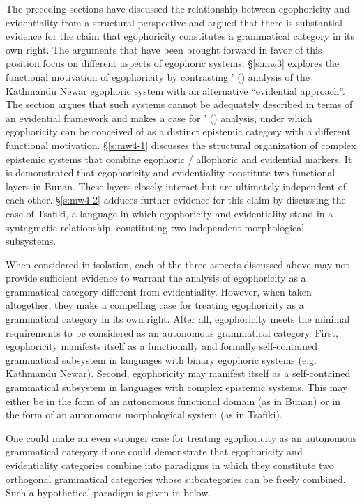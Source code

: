 \documentclass[output=paper]{langsci/langscibook}
\begin{document}
The preceding sections have discussed the relationship between egophoricity and evidentiality from a structural perspective and argued that there is substantial evidence for the claim that egophoricity constitutes a grammatical category in its own right. The arguments that have been brought forward in favor of this position focus on different aspects of egophoric systems. §\ref{s:mw3} explores the functional motivation of egophoricity by contrasting \citeauthor{Hargreaves2005}’ (\citeyear{Hargreaves2005}) analysis of the Kathmandu Newar egophoric system with an alternative “evidential approach”. The section argues that such systems cannot be adequately described in terms of an evidential framework and makes a case for \citeauthor{Hargreaves2005}’ (\citeyear{Hargreaves2005}) analysis, under which egophoricity can be conceived of as a distinct epistemic category with a different functional motivation. §\ref{s:mw4-1} discusses the structural organization of complex epistemic systems that combine egophoric / allophoric and evidential markers. It is demonstrated that egophoricity and evidentiality constitute two functional layers in Bunan. These layers closely interact but are ultimately independent of each other. §\ref{s:mw4-2} adduces further evidence for this claim by discussing the case of Tsafiki, a language in which egophoricity and evidentiality stand in a syntagmatic relationship, constituting two independent morphological subsystems.

When considered in isolation, each of the three aspects discussed above may not provide sufficient evidence to warrant the analysis of egophoricity as a grammatical category different from evidentiality. However, when taken altogether, they make a compelling case for treating egophoricity as a grammatical category in its own right. After all, egophoricity meets the minimal requirements to be considered as an autonomous grammatical category. First, egophoricity manifests itself as a functionally and formally self-contained grammatical subsystem in languages with binary egophoric systems (e.g. Kathmandu Newar). Second, egophoricity may manifest itself as a self-contained grammatical subsystem in languages with complex epistemic systems. This may either be in the form of an autonomous functional domain (as in Bunan) or in the form of an autonomous morphological system (as in Tsafiki).

One could make an even stronger case for treating egophoricity as an autonomous grammatical category if one could demonstrate that egophoricity and evidentiality categories combine into paradigms in which they constitute two orthogonal grammatical categories whose subcategories can be freely combined. Such a hypothetical paradigm is given in  below.
\end{document}
